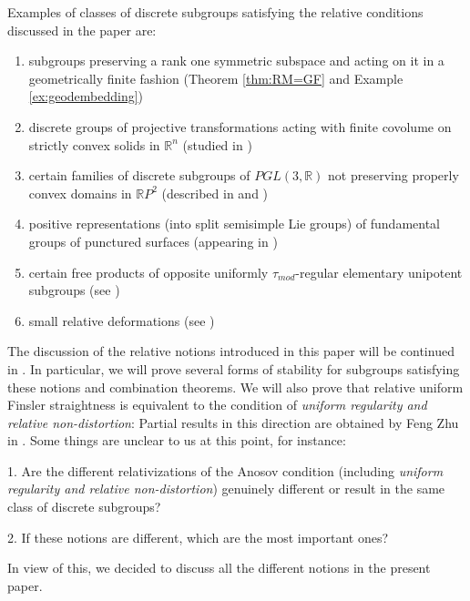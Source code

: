 \documentclass[12pt]{article}
\theoremstyle{boldplain}
\theoremstyle{bolddefinition}
\numberwithin{equation}{section}
\def\R{{\mathbb R}}
\def\taumod{\tau_{mod}}
\begin{document}
Examples of classes of discrete subgroups satisfying the relative conditions 
discussed in the paper are:


\begin{enumerate}
\item subgroups preserving a rank one symmetric subspace and acting on it in a geometrically finite fashion
(Theorem \ref{thm:RM=GF} and Example \ref{ex:geodembedding})

\item discrete groups of projective transformations acting with finite covolume on strictly convex solids in $\R^n$ 
(studied in \cite{CLT}) 

\item certain families of discrete subgroups of $PGL(3,\R)$ not preserving properly convex domains in $\R P^2$
(described in \cite{Sch} and \cite{Kim-Lee})

\item positive representations (into split semisimple Lie groups) of fundamental groups of punctured surfaces
(appearing in \cite{FG}) 

\item certain free products of opposite uniformly $\taumod$-regular elementary unipotent subgroups (see \cite{relmorse-2})

\item small relative deformations 
(see \cite{relmorse-2})
\end{enumerate}

The discussion of the relative notions introduced in this paper 
will be continued in \cite{relmorse-2}. {In particular, we will prove several forms of stability for 
subgroups satisfying these notions and combination theorems. We will also prove that relative uniform Finsler straightness is equivalent to the condition of {\em uniform regularity and relative non-distortion}: Partial results in this direction are obtained by Feng Zhu in \cite{Zhu}. Some things are unclear to us at this point, for instance: }

{1. Are the different relativizations of the Anosov condition (including {\em uniform regularity and relative non-distortion}) genuinely different or result in the same class of discrete subgroups?}  

{2. If these notions are different, which are the most important ones?}

\medskip 
{In view of this, we decided to discuss all the different notions in the present paper.} 
\end{document}
